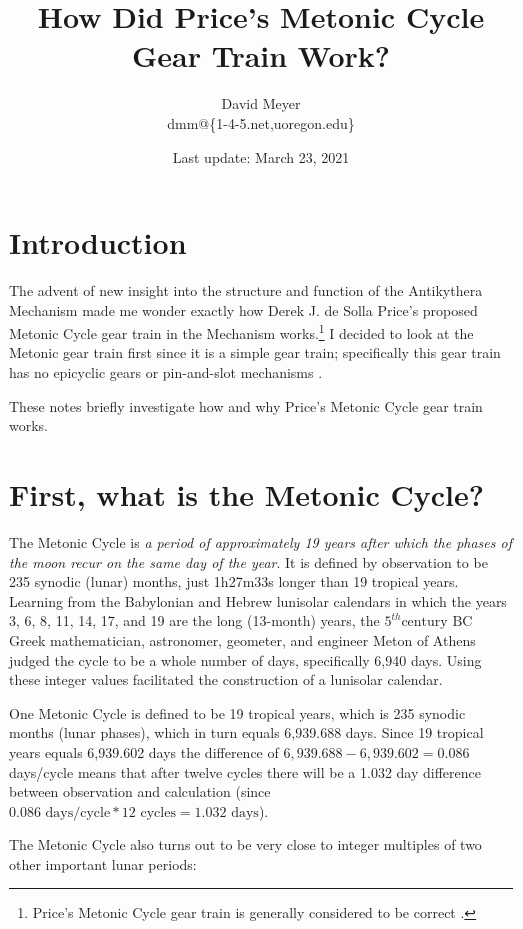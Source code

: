 \documentclass[11pt, oneside]{article}   	%
\title{How Did Price's Metonic Cycle Gear Train Work?}
\author{David Meyer \\ dmm@\{1-4-5.net,uoregon.edu\}}
\date{Last update: March 23, 2021}							%
\theoremstyle{definition}
\begin{document}
\maketitle

\section{Introduction}
The advent of new insight into the structure and function of the Antikythera Mechanism \cite{Freeth2021} made me wonder exactly how 
Derek J. de Solla Price's \cite{wiki:price} proposed Metonic Cycle gear train in the Mechanism works.\footnote{Price's Metonic Cycle gear train
is generally considered to be correct \cite{Freeth2006}.} I decided to look at the Metonic gear train first since it is a simple gear train; 
specifically this gear train has no epicyclic gears \cite{Wright2005} or pin-and-slot mechanisms \cite{Evans2010}.

\bigskip
\noindent
These notes briefly investigate how and why Price's Metonic Cycle gear train works.

\section{First, what is the Metonic Cycle?}
The Metonic Cycle is \emph{a period of approximately 19 years after which the phases of the moon recur on the same day of the year}. It is defined by 
observation to be 235 synodic (lunar) months,  just 1h27m33s longer than 19 tropical years. Learning from the Babylonian and Hebrew lunisolar calendars 
in which the years 3, 6, 8, 11, 14, 17, and 19 are the long (13-month) years, the $5^{th} \text{century BC}$ Greek mathematician, 
astronomer, geometer, and engineer Meton of Athens \cite{wiki:menton} judged the cycle to be a whole number of days, specifically 6,940 days. Using these integer 
values facilitated  the construction of a lunisolar calendar.

\bigskip
\noindent
One Metonic Cycle is defined to be 19 tropical years, which is 235 synodic months (lunar phases), which in turn equals 6,939.688 days. Since
19 tropical years equals 6,939.602 days the difference of  $6,939.688 - 6,939.602 = 0.086$ days/cycle means that after twelve cycles there 
will be a 1.032 day difference between observation and calculation (since $0.086 \text{ days/cycle} * 12 \text{ cycles} = 
1.032 \text{ days}$).  

\newpage

\noindent
The Metonic Cycle also turns out to be very close to integer multiples of two other important lunar periods:
\end{document}
